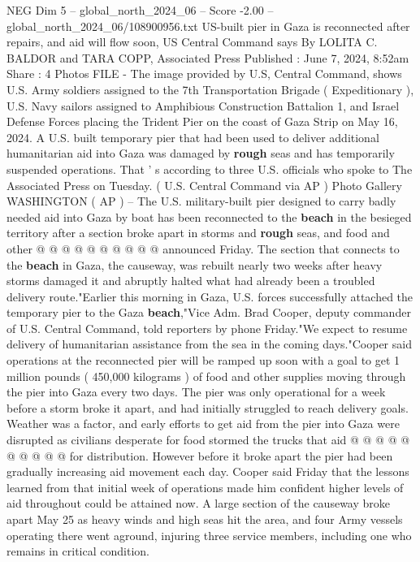 \begin{textsample}{NEG Dim 5 – global\_north\_2024\_06 – Score -2.00 – global\_north\_2024\_06/108900956.txt}  \label{ex:f5_neg_080}
US-built pier in Gaza is reconnected after repairs, and aid will flow soon, US Central Command says By LOLITA C.
BALDOR and TARA COPP, Associated Press Published : June 7, 2024, 8:52am Share : 4 Photos FILE - The image provided by U.S, Central Command, shows U.S.
Army soldiers assigned to the 7th Transportation Brigade ( Expeditionary ), U.S.
Navy sailors assigned to Amphibious Construction Battalion 1, and Israel Defense Forces placing the Trident Pier on the coast of Gaza Strip on May 16, 2024.
A U.S. built temporary pier that had been used to deliver additional humanitarian aid into Gaza was damaged by \textbf{rough} seas and has temporarily suspended operations.
That ' s according to three U.S. officials who spoke to The Associated Press on Tuesday. ( U.S.
Central Command via AP ) Photo Gallery WASHINGTON ( AP ) -- The U.S. military-built pier designed to carry badly needed aid into Gaza by boat has been reconnected to the \textbf{beach} in the besieged territory after a section broke apart in storms and \textbf{rough} seas, and food and other @ @ @ @ @ @ @ @ @ @ announced Friday.
The section that connects to the \textbf{beach} in Gaza, the causeway, was rebuilt nearly two weeks after heavy storms damaged it and abruptly halted what had already been a troubled delivery route."Earlier this morning in Gaza, U.S. forces successfully attached the temporary pier to the Gaza \textbf{beach},"Vice Adm.
Brad Cooper, deputy commander of U.S.
Central Command, told reporters by phone Friday."We expect to resume delivery of humanitarian assistance from the sea in the coming days."Cooper said operations at the reconnected pier will be ramped up soon with a goal to get 1 million pounds ( 450,000 kilograms ) of food and other supplies moving through the pier into Gaza every two days.
The pier was only operational for a week before a storm broke it apart, and had initially struggled to reach delivery goals.
Weather was a factor, and early efforts to get aid from the pier into Gaza were disrupted as civilians desperate for food stormed the trucks that aid @ @ @ @ @ @ @ @ @ @ for distribution.
However before it broke apart the pier had been gradually increasing aid movement each day.
Cooper said Friday that the lessons learned from that initial week of operations made him confident higher levels of aid throughout could be attained now.
A large section of the causeway broke apart May 25 as heavy winds and high seas hit the area, and four Army vessels operating there went aground, injuring three service members, including one who remains in critical condition.

\end{textsample}
